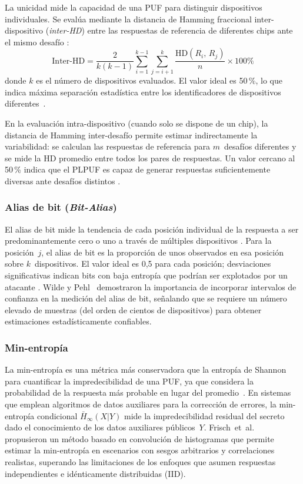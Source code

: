 La unicidad mide la capacidad de una PUF para distinguir dispositivos
individuales. Se evalúa mediante la distancia de Hamming fraccional
inter-dispositivo (\textit{inter-HD}) entre las respuestas de referencia de
diferentes chips ante el mismo desafío
\cite{maiti_2012_systematic}:
\begin{equation}
  \text{Inter-HD} = \frac{2}{k(k-1)} \sum_{i=1}^{k-1} \sum_{j=i+1}^{k}
    \frac{\text{HD}(R_i,\, R_j)}{n} \times 100\%
  \label{eq:uniqueness}
\end{equation}
donde $k$ es el número de dispositivos evaluados. El valor ideal es 50\,\%,
lo que indica máxima separación estadística entre los identificadores de
dispositivos diferentes~\cite{maiti_2012_systematic}.

En la evaluación intra-dispositivo (cuando solo se dispone de un chip), la
distancia de Hamming inter-desafío permite estimar indirectamente la
variabilidad: se calculan las respuestas de referencia para $m$~desafíos
diferentes y se mide la HD promedio entre todos los pares de respuestas. Un
valor cercano al 50\,\% indica que el PLPUF es capaz de generar respuestas
suficientemente diversas ante desafíos distintos
\cite{hori_2011_pseudolfsr}.

\subsubsection{Alias de bit (\textit{Bit-Alias})}

El alias de bit mide la tendencia de cada posición individual de la respuesta
a ser predominantemente cero o uno a través de múltiples dispositivos
\cite{wilde_2020_confidence}. Para la posición~$j$, el alias de bit es la
proporción de unos observados en esa posición sobre $k$~dispositivos. El
valor ideal es 0,5 para cada posición; desviaciones significativas indican
bits con baja entropía que podrían ser explotados por un atacante
\cite{wilde_2020_confidence}. Wilde y Pehl~\cite{wilde_2020_confidence}
demostraron la importancia de incorporar intervalos de confianza en la
medición del alias de bit, señalando que se requiere un número elevado de
muestras (del orden de cientos de dispositivos) para obtener estimaciones
estadísticamente confiables.

\subsubsection{Min-entropía}

La min-entropía es una métrica más conservadora que la entropía de Shannon
para cuantificar la impredecibilidad de una PUF, ya que considera la
probabilidad de la respuesta más probable en lugar del
promedio~\cite{frisch_2023_practical}. En sistemas que emplean algoritmos de
datos auxiliares para la corrección de errores, la min-entropía condicional
$\bar{H}_{\infty}(X|Y)$ mide la impredecibilidad residual del secreto dado
el conocimiento de los datos auxiliares públicos~$Y$. Frisch~et~al.\
\cite{frisch_2023_practical} propusieron un método basado en convolución de
histogramas que permite estimar la min-entropía en escenarios con sesgos
arbitrarios y correlaciones realistas, superando las limitaciones de los
enfoques que asumen respuestas independientes e idénticamente distribuidas
(IID).

